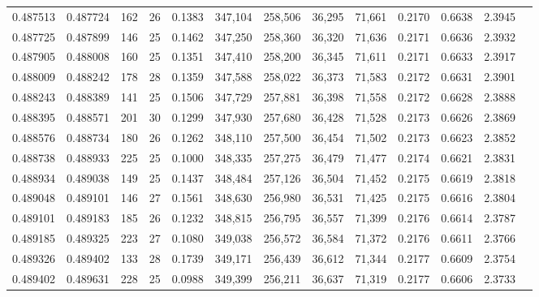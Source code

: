 \begin{tabular}{rrrrrrrrrrrrr}
0.487513 & 0.487724 &   162 &  26 &                                     0.1383 & 347,104 & 258,506 &  36,295 &  71,661 & 0.2170 & 0.6638 & 2.3945 \\
0.487725 & 0.487899 &   146 &  25 &                                     0.1462 & 347,250 & 258,360 &  36,320 &  71,636 & 0.2171 & 0.6636 & 2.3932 \\
0.487905 & 0.488008 &   160 &  25 &                                     0.1351 & 347,410 & 258,200 &  36,345 &  71,611 & 0.2171 & 0.6633 & 2.3917 \\
0.488009 & 0.488242 &   178 &  28 &                                     0.1359 & 347,588 & 258,022 &  36,373 &  71,583 & 0.2172 & 0.6631 & 2.3901 \\
0.488243 & 0.488389 &   141 &  25 &                                     0.1506 & 347,729 & 257,881 &  36,398 &  71,558 & 0.2172 & 0.6628 & 2.3888 \\
0.488395 & 0.488571 &   201 &  30 &                                     0.1299 & 347,930 & 257,680 &  36,428 &  71,528 & 0.2173 & 0.6626 & 2.3869 \\
0.488576 & 0.488734 &   180 &  26 &                                     0.1262 & 348,110 & 257,500 &  36,454 &  71,502 & 0.2173 & 0.6623 & 2.3852 \\
0.488738 & 0.488933 &   225 &  25 &                                     0.1000 & 348,335 & 257,275 &  36,479 &  71,477 & 0.2174 & 0.6621 & 2.3831 \\
0.488934 & 0.489038 &   149 &  25 &                                     0.1437 & 348,484 & 257,126 &  36,504 &  71,452 & 0.2175 & 0.6619 & 2.3818 \\
0.489048 & 0.489101 &   146 &  27 &                                     0.1561 & 348,630 & 256,980 &  36,531 &  71,425 & 0.2175 & 0.6616 & 2.3804 \\
0.489101 & 0.489183 &   185 &  26 &                                     0.1232 & 348,815 & 256,795 &  36,557 &  71,399 & 0.2176 & 0.6614 & 2.3787 \\
0.489185 & 0.489325 &   223 &  27 &                                     0.1080 & 349,038 & 256,572 &  36,584 &  71,372 & 0.2176 & 0.6611 & 2.3766 \\
0.489326 & 0.489402 &   133 &  28 &                                     0.1739 & 349,171 & 256,439 &  36,612 &  71,344 & 0.2177 & 0.6609 & 2.3754 \\
0.489402 & 0.489631 &   228 &  25 &                                     0.0988 & 349,399 & 256,211 &  36,637 &  71,319 & 0.2177 & 0.6606 & 2.3733 \\

\end{tabular}
